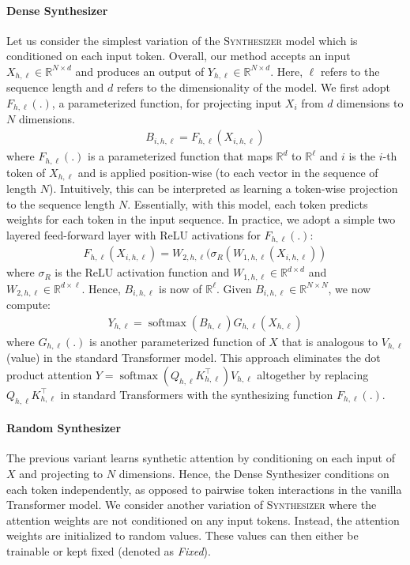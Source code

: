 \documentclass{article}
\DeclareMathOperator{\softmax}{softmax}
\begin{document}
\paragraph{Dense Synthesizer} Let us consider the simplest variation of the \textsc{Synthesizer} model which is conditioned on each input token. Overall, our method accepts an input $X_{h,\ell} \in \mathbb{R}^{N \times d}$ and produces an output of $Y_{h,\ell} \in \mathbb{R}^{N \times d}$. Here, $\ell$ refers to the sequence length and $d$ refers to the dimensionality of the model. We first adopt $F_{h,\ell}(.)$, a parameterized function, for projecting input $X_i$ from $d$ dimensions to $N$ dimensions.
\begin{align}
B_{i,h,\ell} = F_{h,\ell}(X_{i,h,\ell})     
\end{align}
where $F_{h,\ell}(.)$ is a parameterized function that maps $\mathbb{R}^{d}$ to $\mathbb{R}^{\ell}$ and $i$ is the $i$-th token of $X_{h,\ell}$ and is applied position-wise (to each vector in the sequence of length $N$). Intuitively, this can be interpreted as learning a token-wise projection to the sequence length $N$. Essentially, with this model, each token predicts weights for each token in the input sequence. In practice, we adopt a simple two layered feed-forward layer with ReLU activations for $F_{h,\ell}(.)$:
\begin{align}
F_{h,\ell}(X_{i,h,\ell}) = W_{2,h,\ell}(\sigma_{R}(W_{1,h,\ell}(X_{i,h,\ell}))   
\end{align}
where $\sigma_R$ is the ReLU activation function and $W_{1,h,\ell} \in \mathbb{R}^{d \times d}$ and $W_{2,h,\ell} \in \mathbb{R}^{d \times \ell}$. Hence, $B_{i,h,\ell}$ is now of $\mathbb{R}^{\ell}$. Given $B_{i,h,\ell} \in \mathbb{R}^{N \times N}$, we now compute:
\begin{align}
Y_{h,\ell} = \softmax(B_{h,\ell})G_{h,\ell}(X_{h,\ell})    
\end{align}
where $G_{h,\ell}(.)$ is another parameterized function of $X$ that is analogous to $V_{h,\ell}$ (value) in the standard Transformer model. This approach eliminates the dot product attention $Y = \softmax(Q_{h,\ell}K_{h,\ell}^\top)V_{h,\ell}$ altogether by replacing  $Q_{h,\ell}K_{h,\ell}^\top$ in standard Transformers with the synthesizing function $F_{h,\ell}(.)$. 

\paragraph{Random Synthesizer}
The previous variant learns synthetic attention by conditioning on each input of $X$ and projecting to $N$ dimensions. Hence, the Dense Synthesizer conditions on each token independently, as opposed to pairwise token interactions in the vanilla Transformer model. We consider another variation of \textsc{Synthesizer} where the attention weights are not conditioned on any input tokens. Instead, the attention weights are initialized to random values. These values can then either be trainable or kept fixed (denoted as \textit{Fixed}).
\end{document}
